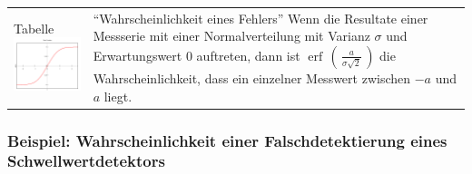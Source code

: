 		\begin{tabular}{ll}
			\parbox{6cm}{
				Tabelle  \\
				\includegraphics[width=5cm]{./bilder/q-funktion.png}
			}
		& 	\parbox{12cm}{
				``Wahrscheinlichkeit eines Fehlers''  \\
				Wenn die Resultate einer Messserie mit einer Normalverteilung mit Varianz
				$\sigma$ und Erwartungswert $0$ auftreten, dann ist
				$\operatorname{erf}\,\left(\,\frac{a}{\sigma \sqrt{2}}\,\right)$ die
				Wahrscheinlichkeit, dass ein einzelner Messwert zwischen $-a$ und $a$ liegt. 
				\\
				 \\
				 \\
			}
		\end{tabular}
	
	
	\subsubsection{Beispiel: Wahrscheinlichkeit einer Falschdetektierung eines Schwellwertdetektors \skript{40}}
		

